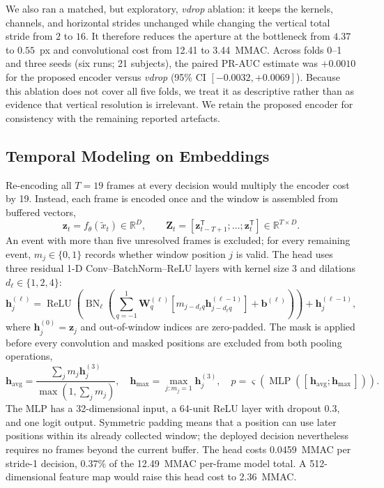 \documentclass{IEEE_lsens}
\begin{document}
We also ran a matched, but exploratory, \emph{vdrop} ablation: it keeps
the kernels, channels, and horizontal strides unchanged while changing
the vertical total stride from $2$ to $16$. It therefore reduces the
aperture at the bottleneck from $4.37$ to $0.55$~px and convolutional
cost from 12.41 to 3.44~MMAC. Across folds 0--1 and three seeds (six
runs; 21 subjects), the paired PR-AUC estimate was $+0.0010$ for the
proposed encoder versus \emph{vdrop} (95\% CI $[-0.0032,+0.0069]$).
Because this ablation does not cover all five folds, we treat it as
descriptive rather than as evidence that vertical resolution is
irrelevant. We retain the proposed encoder for consistency with the
remaining reported artefacts.

\subsection{Temporal Modeling on Embeddings}
Re-encoding all $T=19$ frames at every decision would multiply the
encoder cost by 19. Instead, each frame is encoded once and the window
is assembled from buffered vectors,
\begin{equation}
\bm z_t=f_\theta(\tilde{x}_t)\in\mathbb R^D,\qquad
\bm Z_t=[\bm z_{t-T+1}^{\mathsf T};\ldots;\bm z_t^{\mathsf T}]
\in\mathbb R^{T\times D}.
\label{eq:buffer}
\end{equation}
An event with more than five unresolved frames is excluded; for every
remaining event, $m_j\in\{0,1\}$ records whether window position $j$ is
valid. The head uses three residual 1-D Conv--BatchNorm--ReLU layers
with kernel size 3 and dilations $d_\ell\in\{1,2,4\}$:
\begin{equation}
\bm h_j^{(\ell)}=\operatorname{ReLU}\!\left(\operatorname{BN}_\ell\!\left(
\sum_{q=-1}^{1}\bm W_q^{(\ell)}
 [m_{j-d_\ell q}\bm h_{j-d_\ell q}^{(\ell-1)}]
+\bm b^{(\ell)}\right)\right)+\bm h_j^{(\ell-1)},
\label{eq:tcn}
\end{equation}
where $\bm h_j^{(0)}=\bm z_j$ and out-of-window indices are zero-padded.
The mask is applied before every convolution and masked positions are
excluded from both pooling operations,
\begin{equation}
\bm h_{\mathrm{avg}}=\frac{\sum_jm_j\bm h_j^{(3)}}{\max(1,\sum_jm_j)},\quad
\bm h_{\mathrm{max}}=\max_{j:m_j=1}\bm h_j^{(3)},\quad
p=\varsigma\!\left(\operatorname{MLP}([\,\bm h_{\mathrm{avg}};\bm h_{\mathrm{max}}\,])\right).
\label{eq:pooling}
\end{equation}
The MLP has a 32-dimensional input, a 64-unit ReLU layer with dropout
0.3, and one logit output. Symmetric padding means that a position can
use later positions within its already collected window; the deployed
decision nevertheless requires no frames beyond the current buffer. The
head costs 0.0459~MMAC per stride-1 decision, 0.37\% of the 12.49~MMAC
per-frame model total. A 512-dimensional feature map would raise this
head cost to 2.36~MMAC.
\end{document}
